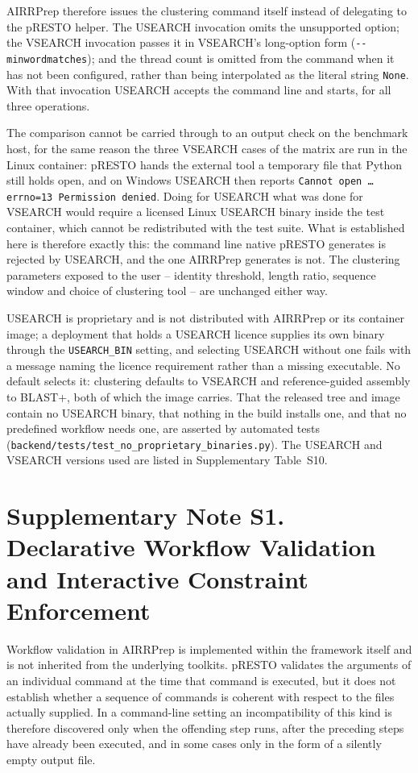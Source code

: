 \documentclass[11pt]{article}
\begin{document}
AIRRPrep therefore issues the clustering command itself instead of delegating
to the pRESTO helper. The USEARCH invocation omits the unsupported option; the
VSEARCH invocation passes it in VSEARCH's long-option form
(\texttt{-{}-minwordmatches}); and the thread count is omitted from the command
when it has not been configured, rather than being interpolated as the literal
string \texttt{None}. With that invocation USEARCH accepts the command line and
starts, for all three operations.

The comparison cannot be carried through to an output check on the benchmark
host, for the same reason the three VSEARCH cases of the matrix are run in the
Linux container: pRESTO hands the external tool a temporary file that Python
still holds open, and on Windows USEARCH then reports
\texttt{Cannot open \ldots errno=13 Permission denied}. Doing for USEARCH what
was done for VSEARCH would require a licensed Linux USEARCH binary inside the
test container, which cannot be redistributed with the test suite. What is
established here is therefore exactly this: the command line native pRESTO
generates is rejected by USEARCH, and the one AIRRPrep generates is not. The
clustering parameters exposed to the user -- identity threshold, length ratio,
sequence window and choice of clustering tool -- are unchanged either way.

USEARCH is proprietary and is not distributed with AIRRPrep or its container
image; a deployment that holds a USEARCH licence supplies its own binary
through the \texttt{USEARCH\_BIN} setting, and selecting USEARCH without one
fails with a message naming the licence requirement rather than a missing
executable. No default selects it: clustering defaults to VSEARCH and
reference-guided assembly to BLAST+, both of which the image carries. That the
released tree and image contain no USEARCH binary, that nothing in the build
installs one, and that no predefined workflow needs one, are asserted by
automated tests
(\texttt{backend/tests/test\_no\_proprietary\_binaries.py}). The USEARCH
and VSEARCH versions used are listed in Supplementary Table~S10.

\clearpage
\section*{Supplementary Note S1. Declarative Workflow Validation and Interactive Constraint Enforcement}

Workflow validation in AIRRPrep is implemented within the framework itself and
is not inherited from the underlying toolkits. pRESTO validates the arguments
of an individual command at the time that command is executed, but it does not
establish whether a sequence of commands is coherent with respect to the files
actually supplied. In a command-line setting an incompatibility of this kind is
therefore discovered only when the offending step runs, after the preceding
steps have already been executed, and in some cases only in the form of a
silently empty output file.
\end{document}
